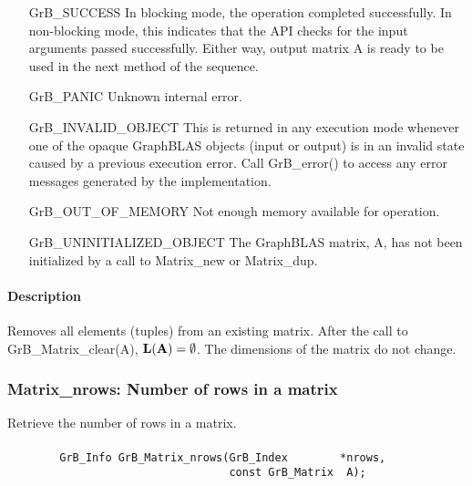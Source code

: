 \begin{itemize}[leftmargin=2.1in]
    \item[{\sf GrB\_SUCCESS}]         In blocking mode, the operation completed
    successfully. In non-blocking mode, this indicates that the API checks 
    for the input arguments passed successfully. Either way, output matrix 
    {\sf A} is ready to be used in the next method of the sequence.

    \item[{\sf GrB\_PANIC}]           Unknown internal error.
    
    \item[{\sf GrB\_INVALID\_OBJECT}] This is returned in any execution mode 
    whenever one of the opaque GraphBLAS objects (input or output) is in an invalid 
    state caused by a previous execution error.  Call {\sf GrB\_error()} to access 
    any error messages generated by the implementation.

    \item[{\sf GrB\_OUT\_OF\_MEMORY}] Not enough memory available for operation.
    
    \item[{\sf GrB\_UNINITIALIZED\_OBJECT}]  The GraphBLAS matrix, {\sf *A}, has 
    not been initialized by a call to {\sf Matrix\_new} or {\sf Matrix\_dup}.
    
\end{itemize}

\paragraph{Description}

Removes all elements (tuples) from an existing matrix. After the call to
{\sf GrB\_Matrix\_clear(A)},
$\mathbf{L}({\bf A}) = \emptyset$. The dimensions of the matrix do not change.


\subsubsection{{\sf Matrix\_nrows}: Number of rows in a matrix}

Retrieve the number of rows in a matrix.

\paragraph{\syntax}

\begin{verbatim}
        GrB_Info GrB_Matrix_nrows(GrB_Index        *nrows,
                                  const GrB_Matrix  A);
\end{verbatim}

